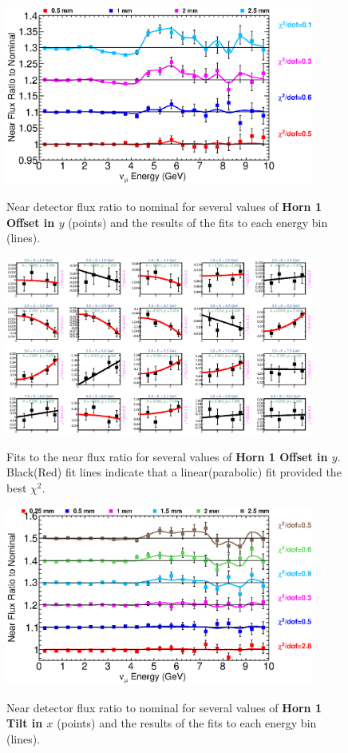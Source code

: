 \begin{figure}[ht]
  \begin{center}
    {\includegraphics[width=4.0in]{figures/Horn1YOffset_near_summary.eps}}
  \end{center}
\caption{ Near detector flux ratio to nominal for several values of {\bf Horn 1 Offset in $y$} (points) and the results of the fits to each energy bin (lines).}
\end{figure}

\begin{figure}[hb]
  \begin{center}
    {\includegraphics[width=4.0in]{figures/Horn1YOffset_near_fits.eps}}
  \end{center}
\caption{ Fits to the near flux ratio for several values of {\bf Horn 1 Offset in $y$}. Black(Red) fit lines indicate that a linear(parabolic) fit provided the best $\chi^2$. }
\end{figure}

\begin{figure}[ht]
  \begin{center}
    {\includegraphics[width=4.0in]{figures/Horn1XTilt_near_summary.eps}}
  \end{center}
\caption{ Near detector flux ratio to nominal for several values of {\bf Horn 1 Tilt in $x$} (points) and the results of the fits to each energy bin (lines).}
\end{figure}

